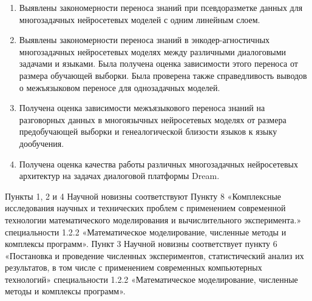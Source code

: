 {\novelty}
\begin{enumerate}
  \item {Выявлены закономерности переноса знаний при псевдоразметке данных для многозадачных нейросетевых моделей с одним линейным слоем.}
  \item {Выявлены закономерности переноса знаний в энкодер-агностичных многозадачных нейросетевых моделях между различными диалоговыми задачами и языками. Была получена оценка зависимости этого переноса от размера обучающей выборки. Была проверена также справедливость выводов о межъязыковом переносе для однозадачных моделей.}
  \item {Получена оценка зависимости межъязыкового переноса знаний на разговорных данных в многоязычных нейросетевых моделях от размера предобучающей выборки и генеалогической близости языков к языку дообучения.}
  \item {Получена оценка качества работы различных многозадачных нейросетевых архитектур на задачах диалоговой платформы Dream.}
\end{enumerate}

{\appropriation}
Пункты 1, 2 и 4 Научной новизны соответствуют Пункту 8 «Комплексные исследования научных и технических проблем с применением современной технологии математического моделирования и вычислительного эксперимента.» специальности 1.2.2 «Математическое моделирование, численные методы и комплексы программ». 
Пункт 3 Научной новизны соответствует пункту 6 «Постановка и проведение численных экспериментов, статистический анализ их результатов, в том числе с применением современных
компьютерных технологий» специальности 1.2.2 «Математическое моделирование, численные методы и комплексы программ». %


